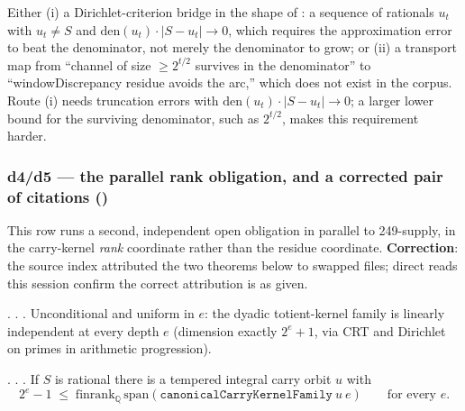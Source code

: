 \begin{prop}
Either (i) a Dirichlet-criterion bridge in the shape of
: a sequence of
rationals $u_t$ with $u_t\ne S$ and $\mathrm{den}(u_t)\cdot|S-u_t|\to 0$, which requires the
approximation error to beat the denominator, not merely the denominator to grow; or (ii) a
transport map from ``channel of size $\ge 2^{t/2}$ survives in the denominator'' to ``windowDiscrepancy
residue avoids the arc,'' which does not exist in the corpus. Route (i) needs truncation errors
with $\mathrm{den}(u_t)\cdot|S-u_t|\to0$; a larger lower bound for the surviving denominator,
such as $2^{t/2}$, makes this requirement harder.
\end{prop}

\subsubsection{d4/d5 --- the parallel rank obligation, and a corrected pair of citations ()}

This row runs a second, independent open obligation in parallel to 249-supply, in the carry-kernel
\emph{rank} coordinate rather than the residue coordinate. \textbf{Correction}: the source index
attributed the two theorems below to swapped files; direct reads this session confirm the correct
attribution is as given.

\begin{thm}
. .
. Unconditional and uniform in $e$: the dyadic totient-kernel family is linearly
independent at every depth $e$ (dimension exactly $2^e{+}1$, via CRT and Dirichlet on primes in
arithmetic progression).
\end{thm}

\begin{thm}
.
. . If $S$ is rational there is a tempered integral carry orbit $u$ with
\[
  2^e - 1 \;\le\; \mathrm{finrank}_{\mathbb Q}\,\mathrm{span}(\mathtt{canonicalCarryKernelFamily}\ u\ e)
  \qquad\text{for every } e .
\]
\end{thm}

